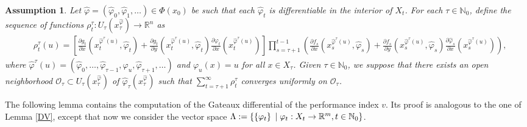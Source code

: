 \documentclass[3p]{elsarticle}
\newcommand{\rzn}{\mathbb R^{n}}
\newcommand{\rzm}{\mathbb R^{m}}
\newcommand{\nat}{\mathbb N_0}
\newtheorem{assu}[thm]{Assumption}
\begin{document}
	
	\begin{assu}\label{AMPms}
		Let  $\hat \varphi=(\hat \varphi_0,\hat \varphi_1,\dots) \in \varPhi(x_0)$ be such that each $\hat\varphi_t$ is differentiable in the interior of $X_t$. For each  $\tau\in\nat$, define the sequence of functions $\rho^\tau_t: U_\tau(x_\tau^{\hat\varphi})\to\rzn$ as \begin{align*}
		&\rho^\tau_t(u)=\left[ \frac{\partial g_t}{\partial x}\left( x_t^{{\hat\varphi^\tau(u)}}, \hat \varphi_t\right)+\frac{\partial g_t}{\partial y}\left( x_t^{{\hat\varphi^\tau(u)}}, \hat \varphi_t\right)\frac{\partial \varphi_t}{\partial x}\left( x_t^{\hat{\varphi}^\tau(u)}\right)\right] \prod_{s=\tau+1}^{t-1}\left( \frac{\partial f_s}{\partial x}\left( x_s^{{\hat\varphi^\tau(u)}}, \hat \varphi_s\right) + \frac{\partial f_s}{\partial y}\left( x_s^{{\hat\varphi^\tau(u)}}, \hat\varphi_s\right)\frac{\partial \hat\varphi_s}{\partial x}\left( x_s^{\hat{\varphi}^\tau(u)}\right)\right) ,
		\end{align*}
		where $\hat\varphi^\tau(u)=(\hat \varphi_0,\dots,\hat \varphi_{\tau-1},\varphi_u,\hat \varphi_{\tau+1},\dots)$ and $\varphi_u(x)=u$ for all $x\in X_\tau$. 
		Given $\tau\in\nat$, we suppose that there exists an open neighborhood $\mathcal O_\tau\subset U_\tau(x_\tau^{\hat\varphi})$ of $\hat \varphi_\tau(x_\tau^
		{\hat\varphi})$ such that $\displaystyle\sum_{t=\tau+1}^\infty\rho^\tau_{t}$ converges uniformly on $\mathcal O_\tau$. 
		
	\end{assu}
	The following lemma contains the computation of the Gateaux differential of the performance index $v$. Its proof is analogous to the one of Lemma \ref{DV}, except that now we consider the vector space $\Lambda:=\left\lbrace \left\lbrace \varphi_t\right\rbrace \hspace{0.1cm}|\hspace{0.1cm}\varphi_t:X_t\to\rzm, t\in\nat\right\rbrace $.
\end{document}

